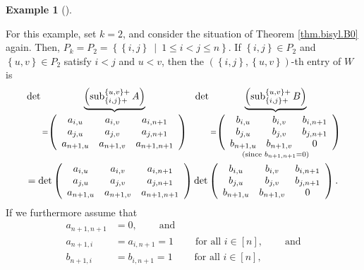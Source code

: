 \documentclass[numbers=enddot,12pt,final,onecolumn,notitlepage]{scrartcl}%
\theoremstyle{definition}
\newtheorem{exam}[theo]{Example}
\newenvironment{example}[1][]
{\begin{exam}[#1]\begin{leftbar}}
{\end{leftbar}\end{exam}}
\begin{document}
\begin{example}
\label{exa.k=2}For this example, set $k=2$, and consider the situation of
Theorem \ref{thm.bisyl.B0} again. Then, $P_{k}=P_{2}=\left\{  \left\{
i,j\right\}  \ \mid\ 1\leq i<j\leq n\right\}  $. If $\left\{  i,j\right\}  \in
P_{2}$ and $\left\{  u,v\right\}  \in P_{2}$ satisfy $i<j$ and $u<v$, then the
$\left(  \left\{  i,j\right\}  ,\left\{  u,v\right\}  \right)  $-th entry of
$W$ is%
\begin{align*}
&  \det\underbrace{\left(  \operatorname*{sub}\nolimits_{\left\{  i,j\right\}
+}^{\left\{  u,v\right\}  +}A\right)  }_{=\left(
\begin{array}
[c]{ccc}%
a_{i,u} & a_{i,v} & a_{i,n+1}\\
a_{j,u} & a_{j,v} & a_{j,n+1}\\
a_{n+1,u} & a_{n+1,v} & a_{n+1,n+1}%
\end{array}
\right)  }\ \ \det\underbrace{\left(  \operatorname*{sub}\nolimits_{\left\{
i,j\right\}  +}^{\left\{  u,v\right\}  +}B\right)  }_{\substack{=\left(
\begin{array}
[c]{ccc}%
b_{i,u} & b_{i,v} & b_{i,n+1}\\
b_{j,u} & b_{j,v} & b_{j,n+1}\\
b_{n+1,u} & b_{n+1,v} & 0
\end{array}
\right)  \\\text{(since }b_{n+1,n+1}=0\text{)}}}\\
&  =\det\left(
\begin{array}
[c]{ccc}%
a_{i,u} & a_{i,v} & a_{i,n+1}\\
a_{j,u} & a_{j,v} & a_{j,n+1}\\
a_{n+1,u} & a_{n+1,v} & a_{n+1,n+1}%
\end{array}
\right)  \det\left(
\begin{array}
[c]{ccc}%
b_{i,u} & b_{i,v} & b_{i,n+1}\\
b_{j,u} & b_{j,v} & b_{j,n+1}\\
b_{n+1,u} & b_{n+1,v} & 0
\end{array}
\right)  .
\end{align*}
If we furthermore assume that
\begin{align*}
a_{n+1,n+1} &  =0,\ \ \ \ \ \ \ \ \ \ \text{and}\\
a_{n+1,i} &  =a_{i,n+1}=1\ \ \ \ \ \ \ \ \ \ \text{for all }i\in\left[
n\right]  ,\ \ \ \ \ \ \ \ \ \ \text{and}\\
b_{n+1,i} &  =b_{i,n+1}=1\ \ \ \ \ \ \ \ \ \ \text{for all }i\in\left[
n\right]  ,
\end{align*}

\end{example}
\end{document}
